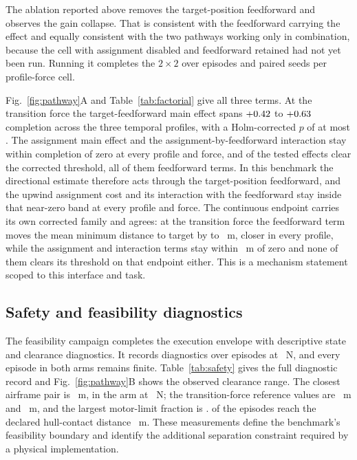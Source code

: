The ablation reported above removes the target-position feedforward and observes
the gain collapse. That is consistent with the feedforward carrying the effect and
equally consistent with the two pathways working only in combination, because the
cell with assignment disabled and feedforward retained had not yet been run.
Running it completes the $2\times2$ over \NFactorialEpisodes{} episodes and
\NFactorialSeeds{} paired seeds per profile-force cell.

Fig.~\ref{fig:pathway}A and Table~\ref{tab:factorial} give all three terms. At the
transition force the target-feedforward main effect spans
$+0.42{}$ to $+0.63{}$ completion across
the three temporal profiles, with a Holm-corrected $p$ of at most
\FactorialFeedforwardHolmMax{}. The assignment main effect and the
assignment-by-feedforward interaction stay within \FactorialOtherAbsMax{}
completion of zero at every profile and force, and \NFactorialHolmSignificant{} of
the \NumFactorialCells{} tested effects clear the corrected threshold, all of them
feedforward terms. In this benchmark the directional estimate therefore acts
through the target-position feedforward, and the upwind assignment cost and its
interaction with the feedforward stay inside that near-zero band at every
profile and force. The continuous endpoint carries its own corrected family and agrees: at
the transition force the feedforward term moves the mean minimum distance to
target by \FactorialContFeedforwardMin{} to \FactorialContFeedforwardMax{}~m,
closer in every profile, while the assignment and interaction terms stay within
\FactorialContOtherAbsMax{}~m of zero and none of them clears its threshold on
that endpoint either. This is a mechanism statement scoped to this interface
and task.

\subsection{Safety and feasibility diagnostics}

The feasibility campaign completes the execution envelope with descriptive
state and clearance diagnostics. It records \NSafetyMetrics{} diagnostics over
\NSafetyEpisodes{} episodes at \SafetyForceGrid{}~N, and every episode in both
arms remains finite. Table~\ref{tab:safety} gives the full diagnostic record and
Fig.~\ref{fig:pathway}B shows the observed clearance range. The closest
airframe pair is \SafetyWorstSeparation{}~m, in the
\SafetyWorstSeparationArm{} arm at \SafetyWorstSeparationForce{}~N; the
transition-force reference values are \SafetyAgnosticSeparationKnee{}~m and
\SafetyAwareSeparationKnee{}~m, and the largest motor-limit fraction is
\SafetyMotorMax{}. \SafetyGeomHullContacts{} of the \NSafetyEpisodes{} episodes
reach the declared hull-contact distance \SafetyGeomHullContactM{}~m. These
measurements define the benchmark's feasibility boundary and identify the
additional separation constraint required by a physical implementation.

